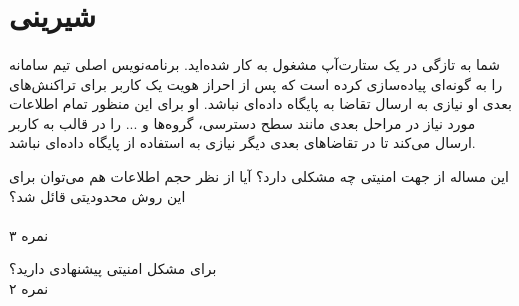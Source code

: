 \documentclass[../main.tex]{subfiles}
\begin{document}
\section{شیرینی}

\paragraph{}
شما به تازگی در یک ستارت‌آپ مشغول به کار شده‌اید.
برنامه‌نویس اصلی تیم سامانه را به گونه‌ای پیاده‌سازی کرده است که پس از احراز هویت یک کاربر
برای تراکنش‌های بعدی او نیازی به ارسال تقاضا به پایگاه داده‌ای نباشد.
او برای این منظور تمام اطلاعات مورد نیاز در مراحل بعدی مانند سطح دسترسی، گروه‌ها و ... را در قالب 
به کاربر ارسال می‌کند تا در تقاضاهای بعدی دیگر نیازی به استفاده از پایگاه داده‌ای نباشد.

این مساله از جهت امنیتی چه مشکلی دارد؟
آیا از نظر حجم اطلاعات هم می‌توان برای این روش محدودیتی قائل شد؟

\paragraph{}
۳ نمره


\begin{extra}
برای مشکل امنیتی پیشنهادی دارید؟
\\
۲ نمره
\end{extra}

\end{document}
